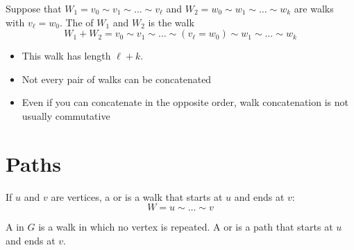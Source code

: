 \documentclass
[ignorenonframetext,aspectratio=169]
{ngelessonslides}
\begin{document}

\begin{frame}[label=concat-def]
\begin{definition}
Suppose that $W_1 = v_0 \sim v_1 \sim \dots \sim v_\ell$ and
$W_2 = w_0 \sim w_1 \sim \dots \sim w_k$
are walks with $v_\ell = w_0$.  The  of $W_1$ and $W_2$
is the walk
\[
   W_1 + W_2 = v_0 \sim v_1 \sim \dots \sim (v_\ell = w_0) \sim w_1 \sim \dots \sim w_k
\]
\end{definition}
\begin{itemize}
\item This walk has length $\ell+k$.
\item Not every pair of walks can be concatenated
\item Even if you can concatenate in the opposite order, walk concatenation is not usually commutative
\end{itemize}
\end{frame}

\section{Paths}

\begin{frame}[label=path-def]
\begin{definition}
    If $u$ and $v$ are vertices, a  or  is a walk that starts at $u$ and ends at $v$:
    \[
        W = u \sim \dots \sim v
    \]
\end{definition}
\begin{definition}
    A  in $G$ is a walk in which no vertex is repeated.
    A  or  is a path that starts at $u$ and ends at $v$.
\end{definition}
\end{frame}
\end{document}
